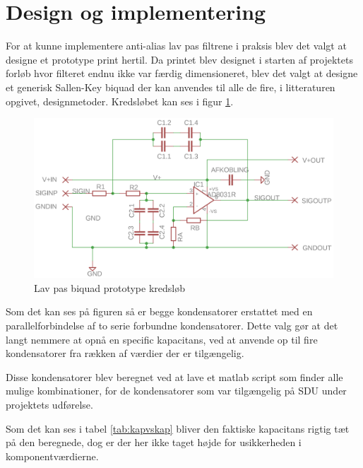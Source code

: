 \section{Design og implementering}\label{sec:filter_design}
For at kunne implementere anti-alias lav pas filtrene i praksis blev det valgt at designe et 
prototype print hertil. Da printet blev designet i starten af projektets forløb hvor filteret 
endnu ikke var færdig dimensioneret, blev det valgt at designe et generisk Sallen-Key biquad 
der kan anvendes til alle de fire, i litteraturen opgivet, designmetoder. Kredsløbet kan ses i 
figur \ref{fig:skbiquadsch}.



\begin{figure}[H]
	\centering
	\includegraphics[width=.7\linewidth]{billeder/skbiquadsch}
	\caption{Lav pas biquad prototype kredsløb}
	\label{fig:skbiquadsch}
\end{figure}

Som det kan ses på figuren så er begge kondensatorer erstattet med en parallelforbindelse af 
to serie forbundne kondensatorer. Dette valg gør at det langt nemmere at opnå en specific 
kapacitans, ved at anvende op til fire kondensatorer fra rækken af værdier der er tilgængelig.

Disse kondensatorer blev beregnet ved at lave et matlab script som finder alle mulige kombinationer, for de kondensatorer som var tilgængelig på SDU under projektets udførelse.

Som det kan ses i tabel \ref{tab:kapvskap} bliver den faktiske kapacitans rigtig tæt på den
beregnede, dog er der her ikke taget højde for usikkerheden i komponentværdierne.

